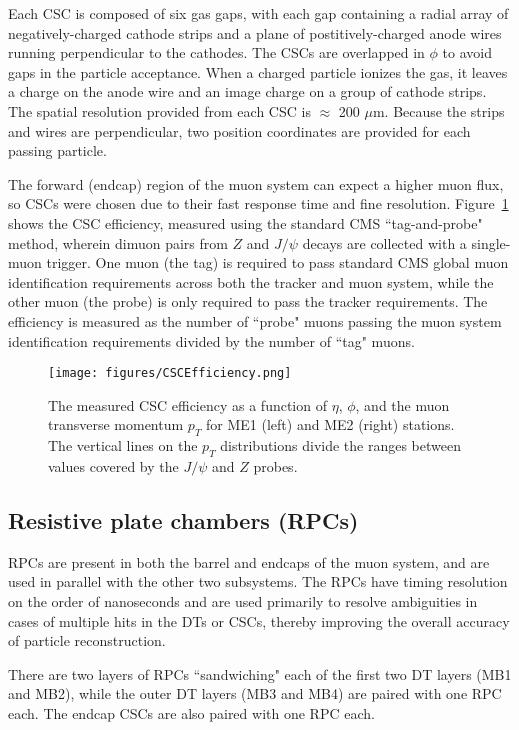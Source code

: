 Each CSC is composed of six gas gaps, with each gap containing a radial array of negatively-charged cathode strips and a plane of postitively-charged anode wires running perpendicular to the cathodes. The CSCs are overlapped in $\phi$ to avoid gaps in the particle acceptance. When a charged particle ionizes the gas, it leaves a charge on the anode wire and an image charge on a group of cathode strips. The spatial resolution provided from each CSC is $\approx$ 200 $\mu$m. Because the strips and wires are perpendicular, two position coordinates are provided for each passing particle.

The forward (endcap) region of the muon system can expect a higher muon flux, so CSCs were chosen due to their fast response time and fine resolution. Figure~\ref{fig:CSCEfficiency} shows the CSC efficiency, measured using the standard CMS ``tag-and-probe" method, wherein dimuon pairs from $Z$ and $J/\psi$ decays are collected with a single-muon trigger. One muon (the tag) is required to pass standard CMS global muon identification requirements across both the tracker and muon system, while the other muon (the probe) is only required to pass the tracker requirements. The efficiency is measured as the number of ``probe" muons passing the muon system identification requirements divided by the number of ``tag" muons.\cite{Muon}

\begin{figure}\centering
  \texttt{[image: figures/CSCEfficiency.png]}
  \caption{\label{fig:CSCEfficiency} The measured CSC efficiency as a function of $\eta$, $\phi$, and the muon transverse momentum $p_T$ for ME1 (left) and ME2 (right) stations. The vertical lines on the $p_T$ distributions divide the ranges between values covered by the $J/\psi$ and $Z$ probes.}
\end{figure}

\subsection{Resistive plate chambers (RPCs)}

RPCs are present in both the barrel and endcaps of the muon system, and are used in parallel with the other two subsystems. The RPCs have timing resolution on the order of nanoseconds and are used primarily to resolve ambiguities in cases of multiple hits in the DTs or CSCs, thereby improving the overall accuracy of particle reconstruction.

There are two layers of RPCs ``sandwiching" each of the first two DT layers (MB1 and MB2), while the outer DT layers (MB3 and MB4) are paired with one RPC each. The endcap CSCs are also paired with one RPC each. 


